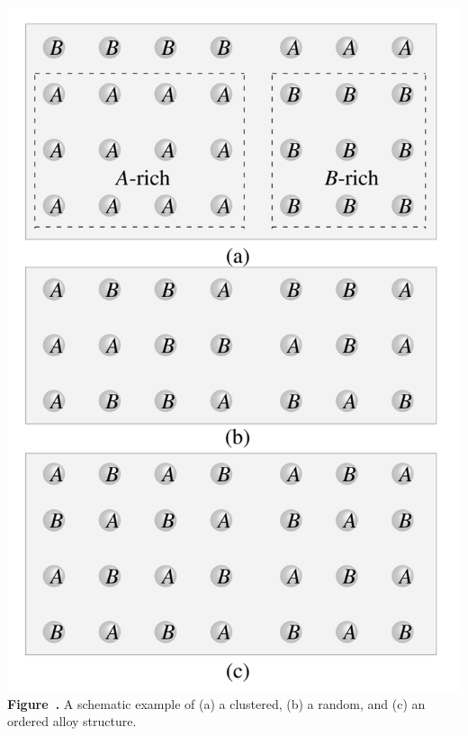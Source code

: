 \begin{center}
	\begin{minipage}{0.4\textwidth}
		\centering
		\includegraphics[width=\textwidth]{img/clustered-ordered-ordered.png}
		\\[0.5em]
		\textbf{Figure~\thefigure.} A schematic example of (a) a clustered, (b) a random, and (c) an ordered alloy structure.
		\label{fig:clustered-ordered-ordered}
	\end{minipage}
\end{center}

